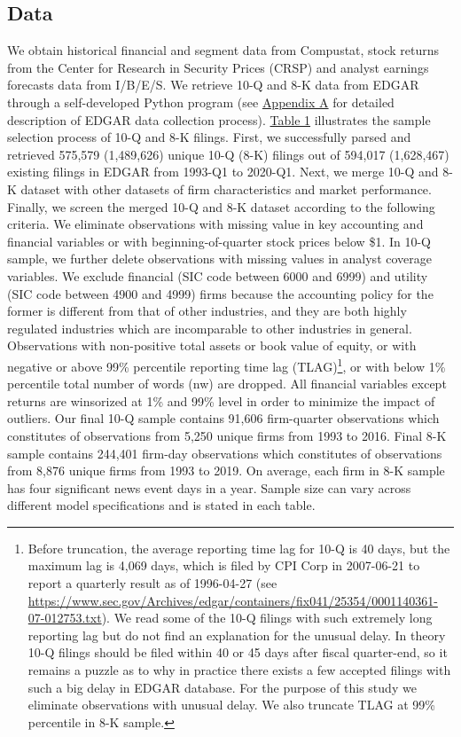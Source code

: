 \documentclass[a4paper]{article}
\begin{document}
\begin{spacing}{2}
\subsection{Data}
We obtain historical financial and segment data from Compustat, stock returns from the Center for Research in Security Prices (CRSP) and analyst earnings forecasts data from I/B/E/S. We retrieve 10-Q and 8-K data from EDGAR through a self-developed Python program (see \hyperref[appa]{Appendix A} for detailed description of EDGAR data collection process). \hyperref[T1]{Table 1} illustrates the sample selection process of 10-Q and 8-K filings. First, we successfully parsed and retrieved 575,579 (1,489,626) unique 10-Q (8-K) filings out of 594,017 (1,628,467) existing filings in EDGAR from 1993-Q1 to 2020-Q1. Next, we merge 10-Q and 8-K dataset with other datasets of firm characteristics and market performance. Finally, we screen the merged 10-Q and 8-K dataset according to the following criteria. We eliminate observations with missing value in key accounting and financial variables or with beginning-of-quarter stock prices below \$1. In 10-Q sample, we further delete observations with missing values in analyst coverage variables. We exclude financial (SIC code between 6000 and 6999) and utility (SIC code between 4900 and 4999) firms because the accounting policy for the former is different from that of other industries, and they are both highly regulated industries which are incomparable to other industries in general. Observations with non-positive total assets or book value of equity, or with negative or above 99\% percentile reporting time lag (TLAG)\footnote{Before truncation, the average reporting time lag for 10-Q is 40 days, but the maximum lag is 4,069 days, which is filed by CPI Corp in 2007-06-21 to report a quarterly result as of 1996-04-27 (see \url{https://www.sec.gov/Archives/edgar/containers/fix041/25354/0001140361-07-012753.txt}). We read some of the 10-Q filings with such extremely long reporting lag but do not find an explanation for the unusual delay. In theory 10-Q filings should be filed within 40 or 45 days after fiscal quarter-end, so it remains a puzzle as to why in practice there exists a few accepted filings with such a big delay in EDGAR database. For the purpose of this study we eliminate observations with unusual delay. We also truncate TLAG at 99\% percentile in 8-K sample.}, or with below 1\% percentile total number of words (nw) are dropped. All financial variables except returns are winsorized at 1\% and 99\% level in order to minimize the impact of outliers. Our final 10-Q sample contains 91,606 firm-quarter observations which constitutes of observations from 5,250 unique firms from 1993 to 2016. Final 8-K sample contains 244,401 firm-day observations which constitutes of observations from 8,876 unique firms from 1993 to 2019. On average, each firm in 8-K sample has four significant news event days in a year. Sample size can vary across different model specifications and is stated in each table. 


\end{spacing}
\end{document}
